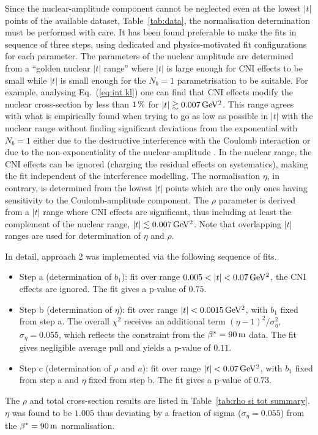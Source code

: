 Since the nuclear-amplitude component cannot be neglected even at the lowest $|t|$ points of the available dataset, Table~\ref{tab:data}, the normalisation determination must be performed with care. It has been found preferable to make the fits in sequence of three steps, using dedicated and physics-motivated fit configurations for each parameter. The parameters of the nuclear amplitude are determined from a ``golden nuclear $|t|$ range'' where $|t|$ is large enough for CNI effects to be small while $|t|$ is small enough for the $N_b = 1$ parametrisation to be suitable. For example, analysing Eq.~(\ref{eq:int kl}) one can find that CNI effects modify the nuclear cross-section by less than $1\,{\rm \%}$ for $|t| \gtrsim 0.007\,{\rm GeV^2}$. This range agrees with what is empirically found when trying to go as low as possible in $|t|$ with the nuclear range without finding significant deviations from the exponential with $N_b = 1$ either due to the destructive interference with the Coulomb interaction or due to the non-exponentiality of the nuclear amplitude \cite{totem-8tev-90m}. In the nuclear range, the CNI effects can be ignored (charging the residual effects on systematics), making the fit independent of the interference modelling. The normalisation $\eta$, in contrary, is determined from the lowest $|t|$ points which are the only ones having sensitivity to the Coulomb-amplitude component. The $\rho$ parameter is derived from a $|t|$ range where CNI effects are significant, thus including at least the complement of the nuclear range, $|t| \lesssim 0.007\,{\rm GeV^2}$. Note that overlapping $|t|$ ranges are used for determination of $\eta$ and $\rho$.

In detail, approach 2 was implemented via the following sequence of fits.
\begin{itemize}[noitemsep,topsep=0pt]
\item Step a (determination of $b_1$): fit over range $0.005 < |t| < 0.07\,{\rm GeV^2}$, the CNI effects are ignored. The fit gives a p-value of $0.75$.
\item Step b (determination of $\eta$): fit over range $|t| < 0.0015\,{\rm GeV^2}$, with $b_1$ fixed from step a. The overall $\chi^2$ receives an additional term $(\eta - 1)^2/ \sigma_\eta^2$, $\sigma_\eta = 0.055$, which reflects the constraint from the $\beta^* = 90\,{\rm m}$ data. The fit gives negligible average pull and yields a p-value of $0.11$.
\item Step c (determination of $\rho$ and $a$): fit over range $|t| < 0.07\,{\rm GeV^2}$, with $b_1$ fixed from step a and $\eta$ fixed from step b. The fit gives a p-value of $0.73$.
\end{itemize}
The $\rho$ and total cross-section results are listed in Table~\ref{tab:rho si tot summary}. $\eta$ was found to be $1.005$ thus deviating by a fraction of sigma ($\sigma_\eta = 0.055$) from the $\beta^* = 90\,{\rm m}$ normalisation.


